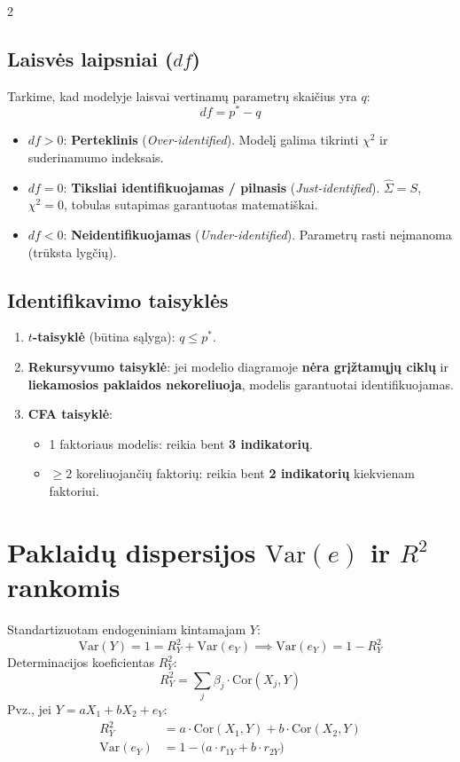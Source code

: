 \documentclass[9pt,a4paper]{article}
\begin{document}
\begin{multicols*}{2}
\subsection{Laisvės laipsniai ($df$)}
Tarkime, kad modelyje laisvai vertinamų parametrų skaičius yra $q$:
\begin{equation*}
    df = p^* - q
\end{equation*}
\begin{itemize}
    \item $df > 0$: \textbf{Perteklinis} (\textit{Over-identified}). Modelį galima tikrinti $\chi^2$ ir suderinamumo indeksais.
    \item $df = 0$: \textbf{Tiksliai identifikuojamas / pilnasis} (\textit{Just-identified}). $\hat{\Sigma} = S$, $\chi^2 = 0$, tobulas sutapimas garantuotas matematiškai.
    \item $df < 0$: \textbf{Neidentifikuojamas} (\textit{Under-identified}). Parametrų rasti neįmanoma (trūksta lygčių).
\end{itemize}

\subsection{Identifikavimo taisyklės}
\begin{enumerate}
    \item \textbf{$t$-taisyklė} (būtina sąlyga): $q \le p^*$.
    \item \textbf{Rekursyvumo taisyklė}: jei modelio diagramoje \textbf{nėra grįžtamųjų ciklų} ir \textbf{liekamosios paklaidos nekoreliuoja}, modelis garantuotai identifikuojamas.
    \item \textbf{CFA taisyklė}:
    \begin{itemize}
        \item 1 faktoriaus modelis: reikia bent \textbf{3 indikatorių}.
        \item $\ge 2$ koreliuojančių faktorių: reikia bent \textbf{2 indikatorių} kiekvienam faktoriui.
    \end{itemize}
\end{enumerate}

\section{Paklaidų dispersijos $\text{Var}(e)$ ir $R^2$ rankomis}
Standartizuotam endogeniniam kintamajam $Y$:
\begin{equation*}
    \text{Var}(Y) = 1 = R_Y^2 + \text{Var}(e_Y) \implies \text{Var}(e_Y) = 1 - R_Y^2
\end{equation*}
Determinacijos koeficientas $R_Y^2$:
\begin{equation*}
    R_Y^2 = \sum_j \beta_j \cdot \text{Cor}(X_j, Y)
\end{equation*}
Pvz., jei $Y = a X_1 + b X_2 + e_Y$:
\begin{align*}
    R_Y^2 &= a \cdot \text{Cor}(X_1, Y) + b \cdot \text{Cor}(X_2, Y) \\
    \text{Var}(e_Y) &= 1 - \big(a \cdot r_{1Y} + b \cdot r_{2Y}\big)
\end{align*}


\end{multicols*}
\end{document}
